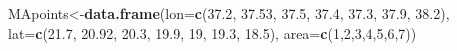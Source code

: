 \documentclass[]{article}
\newenvironment{Shaded}{\begin{snugshade}}{\end{snugshade}}
\newcommand{\KeywordTok}[1]{\textcolor[rgb]{0.13,0.29,0.53}{\textbf{#1}}}
\newcommand{\DataTypeTok}[1]{\textcolor[rgb]{0.13,0.29,0.53}{#1}}
\newcommand{\DecValTok}[1]{\textcolor[rgb]{0.00,0.00,0.81}{#1}}
\newcommand{\FloatTok}[1]{\textcolor[rgb]{0.00,0.00,0.81}{#1}}
\newcommand{\NormalTok}[1]{#1}
\begin{document}
\begin{Shaded}
\begin{Highlighting}[]
\NormalTok{MApoints<-}\KeywordTok{data.frame}\NormalTok{(}\DataTypeTok{lon=}\KeywordTok{c}\NormalTok{(}\FloatTok{37.2}\NormalTok{, }\FloatTok{37.53}\NormalTok{, }\FloatTok{37.5}\NormalTok{, }\FloatTok{37.4}\NormalTok{, }\FloatTok{37.3}\NormalTok{, }\FloatTok{37.9}\NormalTok{, }\FloatTok{38.2}\NormalTok{), }\DataTypeTok{lat=}\KeywordTok{c}\NormalTok{(}\FloatTok{21.7}\NormalTok{, }\FloatTok{20.92}\NormalTok{, }\FloatTok{20.3}\NormalTok{, }\FloatTok{19.9}\NormalTok{, }\DecValTok{19}\NormalTok{, }\FloatTok{19.3}\NormalTok{, }\FloatTok{18.5}\NormalTok{), }\DataTypeTok{area=}\KeywordTok{c}\NormalTok{(}\DecValTok{1}\NormalTok{,}\DecValTok{2}\NormalTok{,}\DecValTok{3}\NormalTok{,}\DecValTok{4}\NormalTok{,}\DecValTok{5}\NormalTok{,}\DecValTok{6}\NormalTok{,}\DecValTok{7}\NormalTok{))}


\end{Highlighting}
\end{Shaded}
\end{document}
